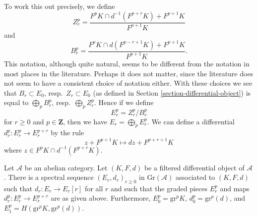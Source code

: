 \medskip\noindent
To work this out precisely, we define
$$
Z_r^p =
\frac{F^pK \cap d^{-1}(F^{p + r}K) + F^{p + 1}K}{F^{p + 1}K}
$$
and
$$
B_r^p =
\frac{F^pK \cap d(F^{p - r + 1}K) + F^{p + 1}K}{F^{p + 1}K}.
$$
This notation, although quite natural, seems to be different from the
notation in most places in the literature. Perhaps it does not matter,
since the literature does not seem to have a consistent choice of notation
either. With these choices we see that $B_r \subset E_0$,
resp.\ $Z_r \subset E_0$ (as defined in
Section \ref{section-differential-object}) is equal to
$\bigoplus_p B_r^p$, resp.\ $\bigoplus_p Z_r^p$.
Hence if we define
$$
E_r^p = Z_r^p/B_r^p
$$
for $r \geq 0$ and $p \in \mathbf{Z}$, then we have $E_r = \bigoplus_p E_r^p$.
We can define a differential $d_r^p : E_r^p \to E_r^{p + r}$
by the rule
$$
z + F^{p + 1}K
\longmapsto
dz + F^{p + r + 1}K
$$
where $z \in F^pK \cap d^{-1}(F^{p + r}K)$.

\begin{lemma}
\label{lemma-spectral-sequence-filtered-differential}
Let $\mathcal{A}$ be an abelian category. Let $(K, F, d)$ be a
filtered differential object of $\mathcal{A}$. There is a
spectral sequence $(E_r, d_r)_{r \geq 0}$ in $\text{Gr}(\mathcal{A})$
associated to $(K, F, d)$ such that $d_r : E_r \to E_r[r]$
for all $r$ and such that the graded pieces
$E_r^p$ and maps $d_r^p : E_r^p \to E_r^{p + r}$
are as given above. Furthermore, $E_0^p = \text{gr}^p K$,
$d_0^p = \text{gr}^p(d)$, and $E_1^p = H(\text{gr}^pK, \text{gr}^p(d))$.
\end{lemma}

